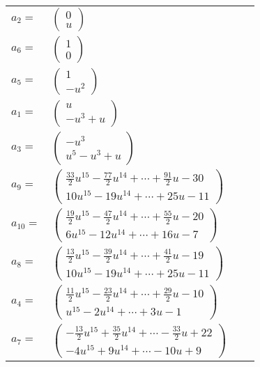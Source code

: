 \documentclass[1p]{elsarticle_modified}
\theoremstyle{definition}
\begin{document}
\begin{tabular}{m{7pt} m{180pt} m{7pt} m{180pt} }
\flushright $a_{2}=$&$\begin{pmatrix}0\\u\end{pmatrix}$ \\
\flushright $a_{6}=$&$\begin{pmatrix}1\\0\end{pmatrix}$ \\
\flushright $a_{5}=$&$\begin{pmatrix}1\\- u^2\end{pmatrix}$ \\
\flushright $a_{1}=$&$\begin{pmatrix}u\\- u^3+u\end{pmatrix}$ \\
\flushright $a_{3}=$&$\begin{pmatrix}- u^3\\u^5- u^3+u\end{pmatrix}$ \\
\flushright $a_{9}=$&$\begin{pmatrix}\frac{33}{2} u^{15}-\frac{77}{2} u^{14}+\cdots+\frac{91}{2} u-30\\10 u^{15}-19 u^{14}+\cdots+25 u-11\end{pmatrix}$ \\
\flushright $a_{10}=$&$\begin{pmatrix}\frac{19}{2} u^{15}-\frac{47}{2} u^{14}+\cdots+\frac{55}{2} u-20\\6 u^{15}-12 u^{14}+\cdots+16 u-7\end{pmatrix}$ \\
\flushright $a_{8}=$&$\begin{pmatrix}\frac{13}{2} u^{15}-\frac{39}{2} u^{14}+\cdots+\frac{41}{2} u-19\\10 u^{15}-19 u^{14}+\cdots+25 u-11\end{pmatrix}$ \\
\flushright $a_{4}=$&$\begin{pmatrix}\frac{11}{2} u^{15}-\frac{23}{2} u^{14}+\cdots+\frac{29}{2} u-10\\u^{15}-2 u^{14}+\cdots+3 u-1\end{pmatrix}$ \\
\flushright $a_{7}=$&$\begin{pmatrix}-\frac{13}{2} u^{15}+\frac{35}{2} u^{14}+\cdots-\frac{33}{2} u+22\\-4 u^{15}+9 u^{14}+\cdots-10 u+9\end{pmatrix}$ \\

\end{tabular}
\end{document}
